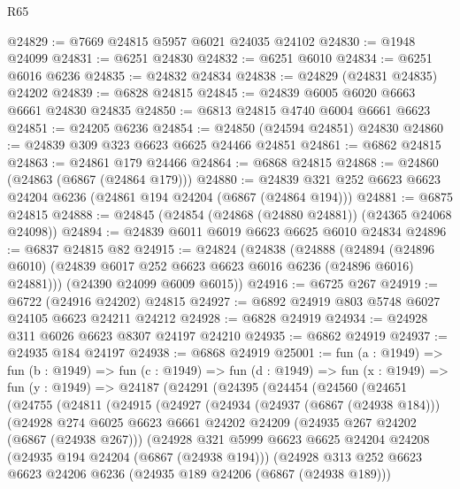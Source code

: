 \begin{lexlean}{R65}
\begin{coremodule}
{@24829 := @7669 @24815 @5957 @6021 @24035 @24102
@24830 := @1948 @24099
@24831 := @6251 @24830
@24832 := @6251 @6010
@24834 := @6251 @6016 @6236
@24835 := @24832 @24834
@24838 := @24829 (@24831 @24835) @24202
@24839 := @6828 @24815
@24845 := @24839 @6005 @6020 @6663 @6661 @24830 @24835
@24850 := @6813 @24815 @4740 @6004 @6661 @6623
@24851 := @24205 @6236
@24854 := @24850 (@24594 @24851) @24830
@24860 := @24839 @309 @323 @6623 @6625 @24466 @24851
@24861 := @6862 @24815
@24863 := @24861 @179 @24466
@24864 := @6868 @24815
@24868 := @24860 (@24863 (@6867 (@24864 @179)))
@24880 := @24839 @321 @252 @6623 @6623 @24204 @6236 (@24861 @194 @24204 (@6867 (@24864 @194)))
@24881 := @6875 @24815
@24888 := @24845 (@24854 (@24868 (@24880 @24881)) (@24365 @24068 @24098))
@24894 := @24839 @6011 @6019 @6623 @6625 @6010 @24834
@24896 := @6837 @24815 @82
@24915 := @24824
    (@24838
      (@24888
        (@24894 (@24896 @6010) (@24839 @6017 @252 @6623 @6623 @6016 @6236 (@24896 @6016) @24881)))
      (@24390 @24099 @6009 @6015))
@24916 := @6725 @267
@24919 := @6722 (@24916 @24202) @24815
@24927 := @6892 @24919 @803 @5748 @6027 @24105 @6623 @24211 @24212
@24928 := @6828 @24919
@24934 := @24928 @311 @6026 @6623 @8307 @24197 @24210
@24935 := @6862 @24919
@24937 := @24935 @184 @24197
@24938 := @6868 @24919
@25001 := fun (a : @1949) =>
  fun (b : @1949) =>
  fun (c : @1949) =>
  fun (d : @1949) =>
  fun (x : @1949) =>
  fun (y : @1949) =>
  @24187
    (@24291
      (@24395
        (@24454
          (@24560
            (@24651
              (@24755
                (@24811
                  (@24915
                    (@24927
                      (@24934
                        (@24937 (@6867 (@24938 @184)))
                        (@24928
                          @274
                          @6025
                          @6623
                          @6661
                          @24202
                          @24209
                          (@24935 @267 @24202 (@6867 (@24938 @267)))
                          (@24928
                            @321
                            @5999
                            @6623
                            @6625
                            @24204
                            @24208
                            (@24935 @194 @24204 (@6867 (@24938 @194)))
                            (@24928
                              @313
                              @252
                              @6623
                              @6623
                              @24206
                              @6236
                              (@24935 @189 @24206 (@6867 (@24938 @189)))
}
\end{coremodule}
\end{lexlean}
